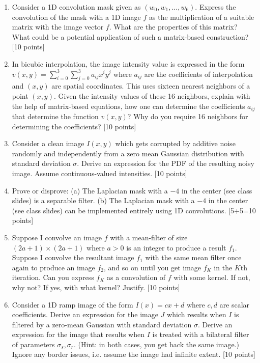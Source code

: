 \documentclass[11pt]{article}
\begin{document}
\begin{enumerate}
\item Consider a 1D convolution mask given as $(w_0, w_1,..., w_6)$. Express the convolution of the mask with a 1D image $f$ as the multiplication of a suitable matrix with the image vector $f$. What are the properties of this matrix? What could be a potential application of such a matrix-based construction? \textsf{[10 points]}

\item In bicubic interpolation, the image intensity value is expressed in the form $v(x,y) = \sum_{i=0}^{3} \sum_{j=0}^{3} a_{ij} x^i y^j$ where $a_{ij}$ are the coefficients of interpolation and $(x,y)$ are spatial coordinates. This uses sixteen nearest neighbors of a point $(x,y)$. Given the intensity values of these 16 neighbors, explain with the help of matrix-based equations, how one can determine the coefficients $a_{ij}$ that determine the function $v(x,y)$? Why do you require 16 neighbors for determining the coefficients? \textsf{[10 points]}

\item Consider a clean image $I(x,y)$ which gets corrupted by additive noise randomly and independently from a zero mean Gaussian distribution with standard deviation $\sigma$. Derive an expression for the PDF of the resulting noisy image. Assume continuous-valued intensities. \textsf{[10 points]}

\item Prove or disprove: (a) The Laplacian mask with a $-4$ in the center (see class slides) is a separable filter. (b) The Laplacian mask with a $-4$ in the center (see class slides) can be implemented entirely using 1D convolutions. \textsf{[5+5=10 points]}

\item Suppose I convolve an image $f$ with a mean-filter of size $(2a+1) \times (2a+1)$ where $a > 0$ is an integer to produce a result $f_1$. Suppose I convolve the resultant image $f_1$ with the same mean filter once again to produce an image $f_2$, and so on until you get image $f_K$ in the $K$th iteration. Can you express $f_K$ as a convolution of $f$ with some kernel. If not, why not? If yes, with what kernel? Justify. \textsf{[10 points]}

\item Consider a 1D ramp image of the form $I(x) = cx + d$ where $c,d$ are scalar coefficients. Derive an expression for the image $J$ which results when $I$ is filtered by a zero-mean Gaussian with standard deviation $\sigma$. Derive an expression for the image that results when $I$ is treated with a bilateral filter of parameters $\sigma_s, \sigma_r$. (Hint: in both cases, you get back the same image.) Ignore any border issues, i.e. assume the image had infinite extent. \textsf{[10 points]}


\end{enumerate}
\end{document}
